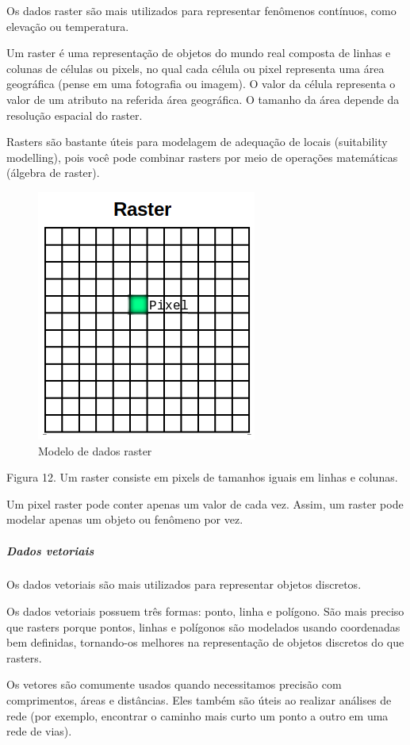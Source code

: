 \documentclass[
]{book}
\begin{document}
Os dados raster são mais utilizados para representar fenômenos contínuos, como elevação ou temperatura.

Um raster é uma representação de objetos do mundo real composta de linhas e colunas de células ou pixels, no qual cada célula ou pixel representa uma área geográfica (pense em uma fotografia ou imagem). O valor da célula representa o valor de um atributo na referida área geográfica. O tamanho da área depende da resolução espacial do raster.

Rasters são bastante úteis para modelagem de adequação de locais (suitability modelling), pois você pode combinar rasters por meio de operações matemáticas (álgebra de raster).

\begin{figure}
\centering
\includegraphics{media/modulo0/raster.png}
\caption{Modelo de dados raster}
\end{figure}

Figura 12. Um raster consiste em pixels de tamanhos iguais em linhas e colunas.

Um pixel raster pode conter apenas um valor de cada vez. Assim, um raster pode modelar apenas um objeto ou fenômeno por vez.

\hypertarget{dados-vetoriais}{%
\subparagraph{Dados vetoriais}\label{dados-vetoriais}}

Os dados vetoriais são mais utilizados para representar objetos discretos.

Os dados vetoriais possuem três formas: ponto, linha e polígono. São mais preciso que rasters porque pontos, linhas e polígonos são modelados usando coordenadas bem definidas, tornando-os melhores na representação de objetos discretos do que rasters.

Os vetores são comumente usados quando necessitamos precisão com comprimentos, áreas e distâncias. Eles também são úteis ao realizar análises de rede (por exemplo, encontrar o caminho mais curto um ponto a outro em uma rede de vias).
\end{document}
